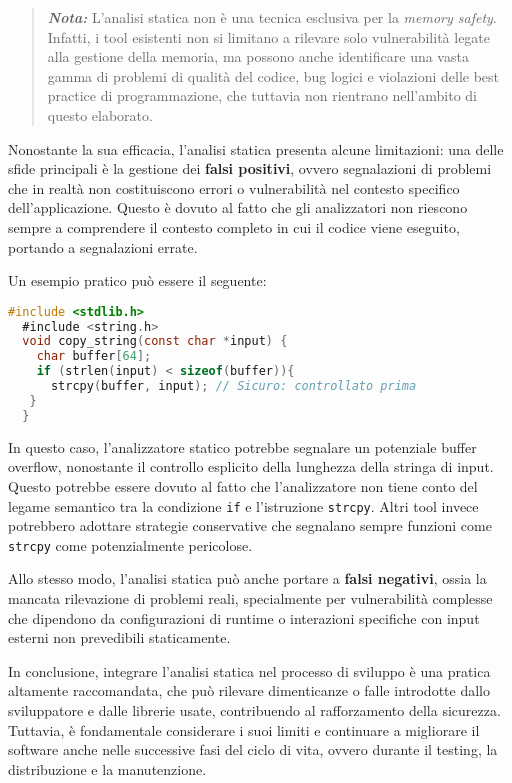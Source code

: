 \begin{quote}
  \textbf{\textit{Nota:}} L'analisi statica non è una tecnica esclusiva per la
  \textit{memory safety}. Infatti, i tool esistenti non si limitano a rilevare solo
  vulnerabilità legate alla gestione della memoria, ma possono anche
  identificare una vasta gamma di problemi di qualità del codice, bug logici e violazioni
  delle best practice di programmazione, che tuttavia non rientrano nell'ambito
  di questo elaborato.
\end{quote}

\noindent
Nonostante la sua efficacia, l'analisi statica presenta alcune limitazioni: una delle
sfide principali è la gestione dei \textbf{falsi positivi}, ovvero segnalazioni di
problemi che in realtà non costituiscono errori o vulnerabilità nel contesto specifico
dell'applicazione. Questo è dovuto al fatto che gli analizzatori non riescono
sempre a comprendere il contesto completo in cui il codice viene eseguito, portando
a segnalazioni errate.

Un esempio pratico può essere il seguente:

\begin{lstlisting}[language=C]
  #include <stdlib.h>
  #include <string.h>
  void copy_string(const char *input) {
    char buffer[64];
    if (strlen(input) < sizeof(buffer)){
      strcpy(buffer, input); // Sicuro: controllato prima
   }
  }
\end{lstlisting}

In questo caso, l'analizzatore statico potrebbe segnalare un potenziale buffer overflow,
nonostante il controllo esplicito della lunghezza della stringa di input. Questo
potrebbe essere dovuto al fatto che l'analizzatore non tiene conto del legame semantico
tra la condizione \texttt{if} e l'istruzione \texttt{strcpy}. Altri tool invece
potrebbero adottare strategie conservative che segnalano sempre funzioni come
\texttt{strcpy} come potenzialmente pericolose.

Allo stesso modo, l'analisi statica può anche portare a \textbf{falsi negativi},
ossia la mancata rilevazione di problemi reali, specialmente per vulnerabilità complesse
che dipendono da configurazioni di runtime o interazioni specifiche con input esterni
non prevedibili staticamente.

In conclusione, integrare l'analisi statica nel processo di sviluppo è una
pratica altamente raccomandata, che può rilevare dimenticanze o falle introdotte
dallo sviluppatore e dalle librerie usate, contribuendo al rafforzamento della
sicurezza. Tuttavia, è fondamentale considerare i suoi limiti e continuare a
migliorare il software anche nelle successive fasi del ciclo di vita, ovvero durante
il testing, la distribuzione e la manutenzione.